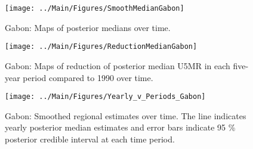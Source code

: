 \documentclass[12pt]{article}\usepackage[]{graphicx}\usepackage[]{color}
\newenvironment{knitrout}{}{} %
\begin{document}
\begin{knitrout}
\color{fgcolor}\begin{figure}[bht]

{\centering \texttt{[image: ../Main/Figures/SmoothMedianGabon]} 

}

\caption[Gabon]{Gabon: Maps of posterior medians over time.}\label{fig:unnamed-chunk-124}
\end{figure}


\end{knitrout}
\begin{knitrout}
\color{fgcolor}\begin{figure}[bht]

{\centering \texttt{[image: ../Main/Figures/ReductionMedianGabon]} 

}

\caption[Gabon]{Gabon: Maps of reduction of posterior median U5MR in each five-year period compared to 1990 over time.}\label{fig:unnamed-chunk-125}
\end{figure}


\end{knitrout}
\begin{knitrout}
\color{fgcolor}\begin{figure}[bht]

{\centering \texttt{[image: ../Main/Figures/Yearly\_v\_Periods\_Gabon]} 

}

\caption[Gabon]{Gabon: Smoothed regional estimates over time. The line indicates yearly posterior median estimates and error bars indicate 95 \% posterior credible interval at each time period.}\label{fig:unnamed-chunk-126}
\end{figure}


\end{knitrout}
\end{document}
